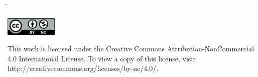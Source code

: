 \vspace{2cm}
\begin{tabbing}
\hspace{3em}\= \kill
\>\theThesisAuthor\\[1ex]
\end{tabbing}

\fi

\ifx\theThesisCC\dictThesisTRUE
\newpage
\begin{center}
 \includegraphics[width=25mm,valign=c]{cel-thesis/logos/cc-by-nc}
\end{center}

\vspace{1cm}
This work is licensed under the Creative Commons Attribution-NonCommercial 4.0 International License. To view a copy of this license, visit http://creativecommons.org/licenses/by-nc/4.0/.
\fi